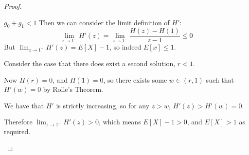 \documentclass[../Main.tex]{subfiles}
\begin{document}
\begin{proof}
\begin{case}{$g_0 + g_1 < 1$}
        Then we can consider the limit definition of $H'$:
        \begin{equation*}
            \lim_{z \to 1^-} H'(z) = \lim_{z \to 1^-} \frac{H(z) - H(1)}{z - 1} \leq 0
        \end{equation*}
        But $\lim_{z \to 1^-} H'(z) = E[X] - 1$, so indeed $E[x] \leq 1$.\par
        Consider the case that there does exist a second solution, $r < 1$.\par
        Now $H(r) = 0$, and $H(1) = 0$, so there exists some $w \in (r, 1)$ such that $H'(w) = 0$ by Rolle's Theorem.\par
        We have that $H'$ is strictly increasing, so for any $z > w$, $H'(z) > H'(w) = 0$.\par
        Therefore $\lim_{z \to 1^-} H'(z) > 0$, which means $E[X] - 1 > 0$, and $E[X] > 1$ as required.
    \end{case}
\end{proof}
\end{document}
